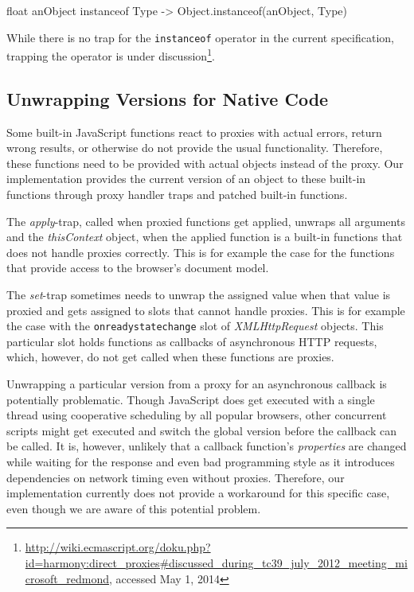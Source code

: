 \begin{code}[]{}{float}
anObject instanceof Type -> Object.instanceof(anObject, Type)
\end{code}
\iffalse
\end{verbatim}\fi

While there is no trap for the \lstinline{instanceof} operator in the current specification, trapping the operator is under discussion\footnote{\url{http://wiki.ecmascript.org/doku.php?id=harmony:direct_proxies\#discussed_during_tc39_july_2012_meeting_microsoft_redmond}, accessed May 1, 2014}.


\subsection{Unwrapping Versions for Native Code}

Some built-in JavaScript functions react to proxies with actual errors, return wrong results, or otherwise do not provide the usual functionality.
Therefore, these functions need to be provided with actual objects instead of the proxy.
Our implementation provides the current version of an object to these built-in functions through proxy handler traps and patched built-in functions.

The \emph{apply}-trap, called when proxied functions get applied, unwraps all arguments and the \emph{thisContext} object, when the applied function is a built-in functions that does not handle proxies correctly.
This is for example the case for the functions that provide access to the browser's document model.

The \emph{set}-trap sometimes needs to unwrap the assigned value when that value is proxied and gets assigned to slots that cannot handle proxies.
This is for example the case with the \lstinline{onreadystatechange} slot of \emph{XMLHttpRequest} objects.
This particular slot holds functions as callbacks of asynchronous HTTP requests, which, however, do not get called when these functions are proxies.

Unwrapping a particular version from a proxy for an asynchronous callback is potentially problematic.
Though JavaScript does get executed with a single thread using cooperative scheduling by all popular browsers, other concurrent scripts might get executed and switch the global version before the callback can be called.
It is, however, unlikely that a callback function's \emph{properties} are changed while waiting for the response and even bad programming style as it introduces dependencies on network timing even without proxies.
Therefore, our implementation currently does not provide a workaround for this specific case, even though we are aware of this potential problem. 


